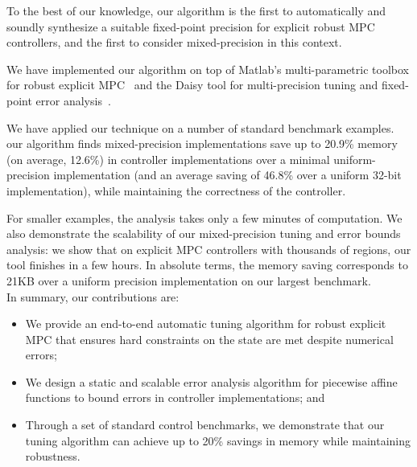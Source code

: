 To the best of our knowledge, our algorithm is the first to automatically and soundly
synthesize a suitable fixed-point precision for explicit robust MPC controllers,
and the first to consider mixed-precision in this context.

We have implemented our algorithm on top of Matlab's multi-parametric toolbox 
for robust explicit MPC~\cite{matlabMPT}
and the Daisy tool for multi-precision tuning and fixed-point error analysis~\cite{Daisy}. %

We have applied our technique on a number of standard benchmark examples. 
our algorithm finds mixed-precision implementations  save up to 20.9\%
memory (on average, 12.6\%) in controller implementations over a minimal
uniform-precision implementation (and an average saving of 46.8\% over a uniform
32-bit implementation), while maintaining the correctness of the controller.

For smaller examples, the analysis takes only a few minutes of computation.
We also demonstrate the scalability of our mixed-precision tuning and error bounds analysis:
we show that on explicit MPC controllers with thousands of regions, our tool finishes in a few hours.
In absolute terms, the memory saving corresponds to 21KB over a uniform
precision implementation on our largest benchmark. %
\\
In summary, our contributions are:
\begin{itemize}
\item We provide an end-to-end automatic tuning algorithm for robust explicit MPC that ensures 
hard constraints on the state are met despite numerical errors;
\item We design a static and scalable error analysis algorithm for piecewise affine functions to bound
errors in controller implementations; and
\item Through a set of standard control benchmarks, we demonstrate that our tuning algorithm
can achieve up to 20\% savings in memory while maintaining robustness.
\end{itemize} 

